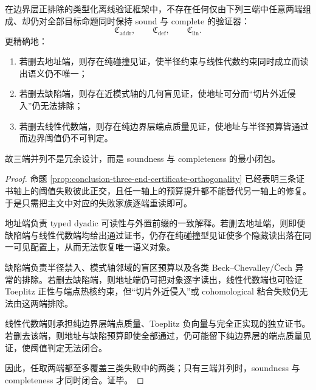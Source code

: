 \begin{theorem}[三端证书的不可约最小性]\label{thm:conclusion-three-end-certificate-irreducibility}
在边界层正排除的类型化离线验证框架中，不存在任何仅由下列三端中任意两端组成、却仍对全部目标命题同时保持 sound 与 complete 的验证器：
\[
\mathfrak C_{\mathrm{addr}},
\qquad
\mathfrak C_{\mathrm{def}},
\qquad
\mathfrak C_{\mathrm{lin}}.
\]
更精确地：
\begin{enumerate}
  \item 若删去地址端，则存在纯碰撞见证，使半径约束与线性代数约束同时成立而读出语义仍不唯一；
  \item 若删去缺陷端，则存在近模式轴的几何盲见证，使地址可分而“切片外近侵入”仍无法排除；
  \item 若删去线性代数端，则存在纯边界层端点质量见证，使地址与半径预算皆通过而边界阈值仍不可判定。
\end{enumerate}
故三端并列不是冗余设计，而是 soundness 与 completeness 的最小闭包。
\end{theorem}
\begin{proof}
命题 \ref{prop:conclusion-three-end-certificate-orthogonality} 已经表明三条证书轴上的阈值失败彼此正交，且任一轴上的预算提升都不能替代另一轴上的修复。于是只需把主文中对应的失败家族逐端重读即可。

地址端负责 typed dyadic 可读性与外置前缀的一致解释。若删去地址端，则即便缺陷端与线性代数端均给出通过证书，仍存在纯碰撞型见证使多个隐藏读出落在同一可见配置上，从而无法恢复唯一语义对象。

缺陷端负责半径禁入、模式轴邻域的盲区预算以及各类 Beck--Chevalley/Čech 异常的排除。若删去缺陷端，则地址端仍可把对象逐字读出，线性代数端也可验证 Toeplitz 正性与端点热核约束，但“切片外近侵入”或 cohomological 粘合失败仍无法由这两端排除。

线性代数端则承担纯边界层端点质量、Toeplitz 负向量与完全正实现的独立证书。若删去该端，则地址与缺陷预算即使全部通过，仍可能留下纯边界层的端点质量见证，使阈值判定无法闭合。

因此，任取两端都至多覆盖三类失败中的两类；只有三端并列时，soundness 与 completeness 才同时闭合。证毕。
\end{proof}
